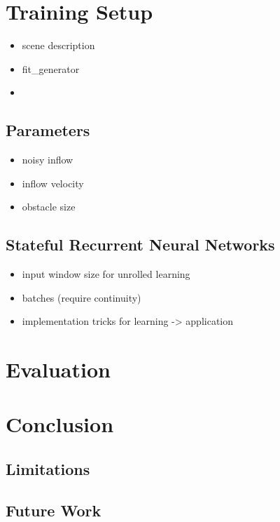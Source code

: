 \documentclass[sigconf]{acmart}
\begin{document}
\section{Training Setup}
\begin{itemize}
	\item scene description
	\item fit\_generator
	\item 
\end{itemize}
\subsection{Parameters}
\begin{itemize}
	\item noisy inflow
	\item inflow velocity
	\item obstacle size
\end{itemize}
\subsection{Stateful Recurrent Neural Networks}
\begin{itemize}
	\item input window size for unrolled learning
	\item batches (require continuity)
	\item implementation tricks for learning -> application
\end{itemize}
\section{Evaluation}
\section{Conclusion}
\subsection{Limitations}
\subsection{Future Work}


%

\end{document}
